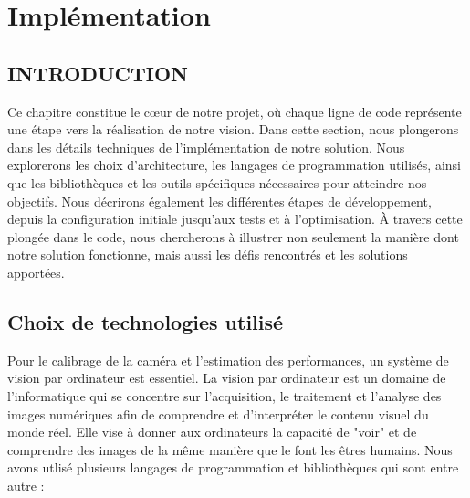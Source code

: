 \chapter{Implémentation}
\begin{spacing}{1.2}
\minitoc
\thispagestyle{MyStyle}
\end{spacing}
\newpage

\section{INTRODUCTION}
Ce chapitre constitue le cœur de notre projet, où chaque ligne de code représente une étape vers la réalisation de notre vision.
Dans cette section, nous plongerons dans les détails techniques de l'implémentation de notre solution. Nous explorerons les choix d'architecture, les langages de programmation utilisés, ainsi que les bibliothèques et les outils spécifiques nécessaires pour atteindre nos objectifs. Nous décrirons également les différentes étapes de développement, depuis la configuration initiale jusqu'aux tests et à l'optimisation.
À travers cette plongée dans le code, nous chercherons à illustrer non seulement la manière dont notre solution fonctionne, mais aussi les défis rencontrés et les solutions apportées.  
 
 \section{Choix de technologies utilisé}
 
 Pour le calibrage de la caméra et l'estimation des performances, un système de vision par ordinateur est essentiel. La vision par ordinateur est un domaine de l'informatique qui se concentre sur l'acquisition, le traitement et l'analyse des images numériques afin de comprendre et d'interpréter le contenu visuel du monde réel. Elle vise à donner aux ordinateurs la capacité de "voir" et de comprendre des images de la même manière que le font les êtres humains.
 Nous avons utlisé plusieurs langages de programmation et bibliothèques qui sont entre autre : 
 
